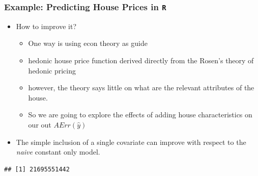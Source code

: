 \documentclass[
  shownotes,
  xcolor={svgnames},
  hyperref={colorlinks,citecolor=DarkBlue,linkcolor=DarkRed,urlcolor=DarkBlue}
  ]{beamer}
\newenvironment{Shaded}{\begin{snugshade}}{\end{snugshade}}
\newcommand{\DataTypeTok}[1]{\textcolor[rgb]{0.13,0.29,0.53}{#1}}
\newcommand{\DecValTok}[1]{\textcolor[rgb]{0.00,0.00,0.81}{#1}}
\newcommand{\KeywordTok}[1]{\textcolor[rgb]{0.13,0.29,0.53}{\textbf{#1}}}
\newcommand{\NormalTok}[1]{#1}
\newcommand{\OperatorTok}[1]{\textcolor[rgb]{0.81,0.36,0.00}{\textbf{#1}}}
\begin{document}
\begin{frame}[fragile]
\frametitle{Example: Predicting House Prices in \texttt{R}}

\begin{itemize}
 \item How to improve it?
   \begin{itemize}
   \item One way is using econ theory as guide
   \item hedonic house price function derived directly from the Rosen's theory of hedonic pricing
   \item however, the theory says little on what are the relevant attributes of the house.
   \item So we are going to explore the effects of adding house characteristics on our out $AErr(\hat y)$
  \end{itemize}
  \item The simple inclusion of a single covariate can improve with respect to the \textit{naive} constant only model.
\end{itemize}



\begin{Shaded}
\footnotesize
{}
\end{Shaded}

\begin{tiny}
\begin{verbatim}
## [1] 21695551442
\end{verbatim}
\end{tiny}
\end{frame}


\end{document}

